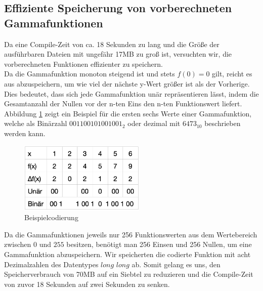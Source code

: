 \documentclass[course=erap]{aspdoc}
\begin{document}
	\subsection{Effiziente Speicherung von vorberechneten Gammafunktionen}
	Da eine Compile-Zeit von ca. 18 Sekunden zu lang und die Größe der ausführbaren Dateien mit ungefähr 17MB zu groß ist, versuchten wir, die vorberechneten Funktionen effizienter zu speichern.
	\\
	\newline
	\noindent
	Da die Gammafunktion monoton steigend ist und stets $f(0)=0$ gilt, reicht es aus abzuspeichern, um wie viel der nächste y-Wert größer ist als der Vorherige. Dies bedeutet, dass sich jede Gammafunktion unär repräsentieren lässt, indem die Gesamtanzahl der Nullen vor der n-ten Eins den n-ten Funktionswert liefert. Abbildung \ref{KompremierungBeispiel} zeigt ein Beispiel für die ersten sechs Werte einer Gammafunktion, welche als Binärzahl $001100101001001_{2}$ oder dezimal mit $6473_{10}$ beschrieben werden kann.
	
	\noindent
	\begin{figure}
        \includegraphics[width=6cm]{Images/CompressionOfFunctions.png}
         \caption{Beispielcodierung}
         \label{KompremierungBeispiel}
    \end{figure}
	Da die Gammafunktionen jeweils nur 256 Funktionswerten aus dem Wertebereich zwischen $0$ und $255$ besitzen, benötigt man 256 Einsen und 256 Nullen, um eine Gammafunktion abzuspeichern. Wir speicherten die codierte Funktion mit acht Dezimalzahlen des Datentypes $long$ $long$ ab. Somit gelang es uns, den Speicherverbrauch von 70MB auf ein Siebtel zu reduzieren und die Compile-Zeit von zuvor 18 Sekunden auf zwei Sekunden zu senken. 
\end{document}
